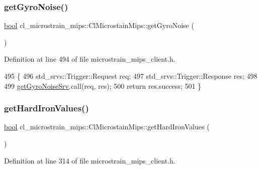 \subsubsection{\texorpdfstring{get\+Gyro\+Noise()}{getGyroNoise()}}
{\footnotesize\ttfamily \hyperlink{classbool}{bool} cl\+\_\+microstrain\+\_\+mips\+::\+Cl\+Microstain\+Mips\+::get\+Gyro\+Noise (\begin{DoxyParamCaption}{ }\end{DoxyParamCaption})\hspace{0.3cm}{\ttfamily [inline]}}



Definition at line 494 of file microstrain\+\_\+mips\+\_\+client.\+h.


\begin{DoxyCode}
495     \{
496         std\_srvs::Trigger::Request req;
497         std\_srvs::Trigger::Response res;
498 
499         \hyperlink{classcl__microstrain__mips_1_1ClMicrostainMips_a7876569caf3e8169a1972ad8a591c772}{getGyroNoiseSrv}.call(req, res);
500         \textcolor{keywordflow}{return} res.success;
501     \}
\end{DoxyCode}
\mbox{\label{classcl__microstrain__mips_1_1ClMicrostainMips_aa138907ebb7fb634373f948028202749}} 
\subsubsection{\texorpdfstring{get\+Hard\+Iron\+Values()}{getHardIronValues()}}
{\footnotesize\ttfamily \hyperlink{classbool}{bool} cl\+\_\+microstrain\+\_\+mips\+::\+Cl\+Microstain\+Mips\+::get\+Hard\+Iron\+Values (\begin{DoxyParamCaption}{ }\end{DoxyParamCaption})\hspace{0.3cm}{\ttfamily [inline]}}



Definition at line 314 of file microstrain\+\_\+mips\+\_\+client.\+h.


